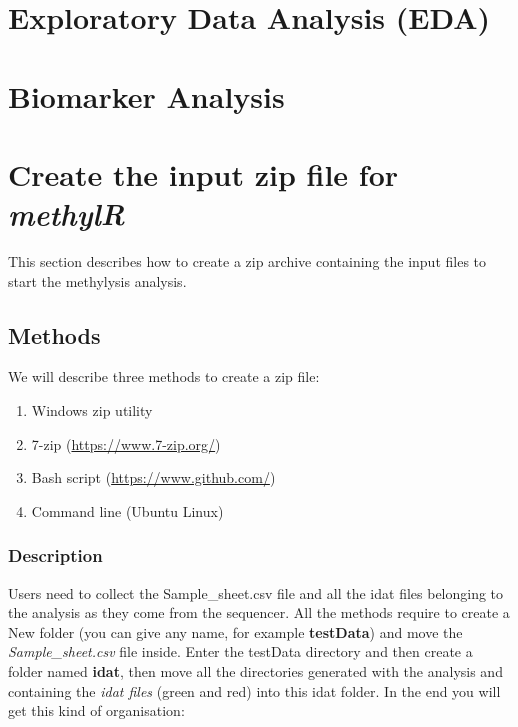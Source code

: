 \documentclass[
  a4paper,
  DIV=11,
  numbers=noendperiod,
  oneside,
  open=any]{scrreport}
\providecommand{\tightlist}{%
  \setlength{\itemsep}{0pt}\setlength{\parskip}{0pt}}\usepackage{longtable,booktabs,array}
\begin{document}
\chapter{Exploratory Data Analysis
(EDA)}\label{exploratory-data-analysis-eda}

\chapter{Biomarker Analysis}\label{biomarker-analysis}

\cleardoublepage
{}
{}
\appendix

\chapter{\texorpdfstring{Create the input zip file for
\emph{methylR}}{Create the input zip file for methylR}}\label{sec-inputzip}

This section describes how to create a zip archive containing the input
files to start the methylysis analysis.

\section{Methods}\label{methods}

We will describe three methods to create a zip file:

\begin{enumerate}
\def\labelenumi{\arabic{enumi}.}
\tightlist
\item
  Windows zip utility
\item
  7-zip (\url{https://www.7-zip.org/})
\item
  Bash script
  (\href{https://github.com/JD2112/methylr/blob/main/script.sh}{https://www.github.com/})
\item
  Command line (Ubuntu Linux)
\end{enumerate}

\subsection{Description}\label{description}

Users need to collect the Sample\_sheet.csv file and all the idat files
belonging to the analysis as they come from the sequencer. All the
methods require to create a New folder (you can give any name, for
example \textbf{testData}) and move the \emph{Sample\_sheet.csv} file
inside. Enter the testData directory and then create a folder named
\textbf{idat}, then move all the directories generated with the analysis
and containing the \emph{idat files} (green and red) into this idat
folder. In the end you will get this kind of organisation:
\end{document}
